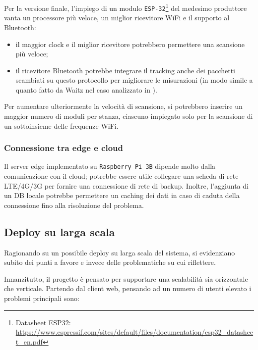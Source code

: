Per la versione finale, l'impiego di un modulo \texttt{ESP-32}\footnote{Datasheet ESP32: \url{https://www.espressif.com/sites/default/files/documentation/esp32_datasheet_en.pdf}}
del medesimo produttore vanta un processore più veloce, un miglior ricevitore WiFi e il supporto al Bluetooth:
\begin{itemize}
  \item
    il maggior clock e il miglior ricevitore potrebbero permettere una scansione più veloce;
  \item
    il ricevitore Bluetooth potrebbe integrare il tracking anche dei pacchetti scambiati su questo protocollo per migliorare le misurazioni
    (in modo simile a quanto fatto da Waitz nel caso analizzato in ).
\end{itemize}

Per aumentare ulteriormente la velocità di scansione, si potrebbero inserire un maggior numero di moduli per stanza, ciascuno impiegato solo per la scansione di un sottoinsieme delle frequenze WiFi.

\subsubsection{Connessione tra edge e cloud}

Il server edge implementato su \texttt{Raspberry Pi 3B} dipende molto dalla comunicazione con il cloud;
potrebbe essere utile collegare una scheda di rete LTE/4G/3G per fornire una connessione di rete di backup.
Inoltre, l'aggiunta di un DB locale potrebbe permettere un caching dei dati in caso di caduta della connessione fino alla risoluzione del problema.

\subsection{Deploy su larga scala}

Ragionando su un possibile deploy su larga scala del sistema, si evidenziano subito dei punti a favore e invece delle problematiche su cui riflettere.

Innanzitutto, il progetto è pensato per supportare una scalabilità sia orizzontale che verticale.
Partendo dal client web, pensando ad un numero di utenti elevato i problemi principali sono:

